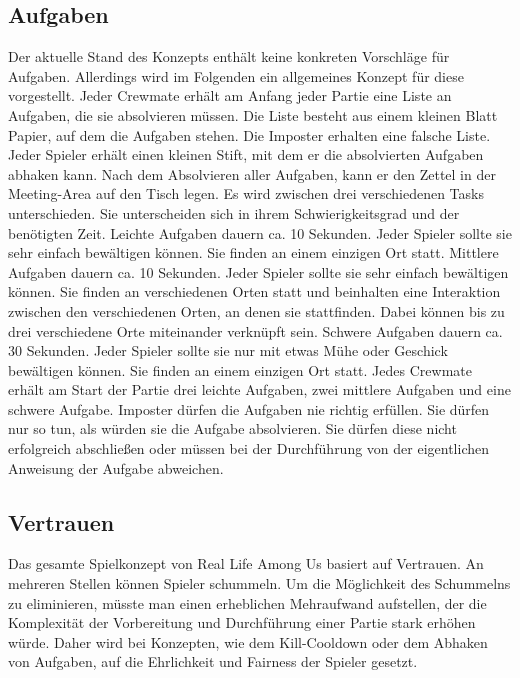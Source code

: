 \subsection{Aufgaben}
Der aktuelle Stand des Konzepts enthält keine konkreten Vorschläge für Aufgaben.
Allerdings wird im Folgenden ein allgemeines Konzept für diese vorgestellt.
\newline
Jeder Crewmate erhält am Anfang jeder Partie eine Liste an Aufgaben, die sie
absolvieren müssen. Die Liste besteht aus einem kleinen Blatt Papier, auf dem
die Aufgaben stehen.  Die Imposter erhalten eine falsche Liste.
Jeder Spieler erhält einen kleinen Stift, mit dem er die absolvierten Aufgaben
abhaken kann. Nach dem Absolvieren aller Aufgaben, kann er den Zettel in der
Meeting-Area auf den Tisch legen.
\newline
Es wird zwischen drei verschiedenen Tasks
unterschieden. Sie unterscheiden sich in ihrem Schwierigkeitsgrad und der
benötigten Zeit.
\newline
Leichte Aufgaben dauern ca. 10 Sekunden. Jeder Spieler sollte sie sehr einfach
bewältigen können. Sie finden an einem einzigen Ort statt.
\newline
Mittlere Aufgaben dauern ca. 10 Sekunden. Jeder Spieler sollte sie sehr einfach
bewältigen können. Sie finden an verschiedenen Orten statt und beinhalten
eine Interaktion zwischen den verschiedenen Orten, an denen sie stattfinden.
Dabei können bis zu drei verschiedene Orte miteinander verknüpft sein.
\newline
Schwere Aufgaben dauern ca. 30 Sekunden. Jeder Spieler sollte sie nur mit etwas
Mühe oder Geschick bewältigen können. Sie finden an einem einzigen Ort statt.
\newline
Jedes Crewmate erhält am Start der Partie drei leichte Aufgaben, zwei mittlere
Aufgaben und eine schwere Aufgabe.
\newline
Imposter dürfen die Aufgaben nie richtig erfüllen. Sie dürfen nur so tun, als
würden sie die Aufgabe absolvieren. Sie dürfen diese nicht erfolgreich
abschließen oder müssen bei der Durchführung von der eigentlichen Anweisung der
Aufgabe abweichen.


\subsection{Vertrauen}
Das gesamte Spielkonzept von Real Life Among Us basiert auf Vertrauen. An
mehreren Stellen können Spieler schummeln. Um die Möglichkeit des Schummelns zu
eliminieren, müsste man einen erheblichen Mehraufwand aufstellen, der die
Komplexität der Vorbereitung und Durchführung einer Partie stark erhöhen würde.
Daher wird bei Konzepten, wie dem Kill-Cooldown oder dem Abhaken von Aufgaben,
auf die Ehrlichkeit und Fairness der Spieler gesetzt.

